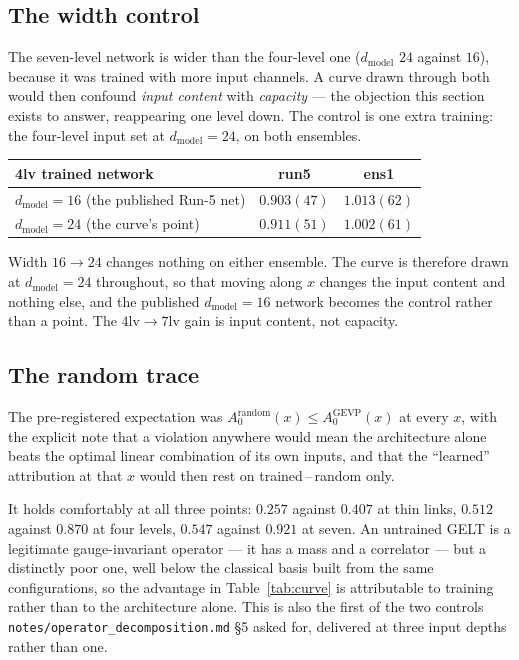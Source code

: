 \documentclass[11pt,a4paper]{article}
\newcommand{\Azero}{A_0}
\begin{document}
\subsection{The width control}
\label{sec:width}

The seven-level network is wider than the four-level one ($d_{\text{model}}$
$24$ against $16$), because it was trained with more input channels. A curve
drawn through both would then confound \emph{input content} with \emph{capacity}
--- the objection this section exists to answer, reappearing one level down. The
control is one extra training: the four-level input set at $d_{\text{model}} =
24$, on both ensembles.

\begin{center}\small
\begin{tabular}{@{}lcc@{}}
\toprule
4lv trained network & run5 & ens1 \\
\midrule
$d_{\text{model}} = 16$ (the published Run-5 net) & $0.903(47)$ & $1.013(62)$ \\
$d_{\text{model}} = 24$ (the curve's point)       & $0.911(51)$ & $1.002(61)$ \\
\bottomrule
\end{tabular}
\end{center}

Width $16 \to 24$ changes nothing on either ensemble. The curve is therefore
drawn at $d_{\text{model}} = 24$ throughout, so that moving along $x$ changes
the input content and nothing else, and the published $d_{\text{model}} = 16$
network becomes the control rather than a point. The $4\text{lv} \to 7\text{lv}$
gain is input content, not capacity.

\subsection{The random trace}
\label{sec:randomtrace}

The pre-registered expectation was $\Azero^{\text{random}}(x) \le
\Azero^{\text{GEVP}}(x)$ at every $x$, with the explicit note that a violation
anywhere would mean the architecture alone beats the optimal linear combination
of its own inputs, and that the ``learned'' attribution at that $x$ would then
rest on trained\,--\,random only.

It holds comfortably at all three points: $0.257$ against $0.407$ at thin links,
$0.512$ against $0.870$ at four levels, $0.547$ against $0.921$ at seven. An
untrained GELT is a legitimate gauge-invariant operator --- it has a mass and a
correlator --- but a distinctly poor one, well below the classical basis built
from the same configurations, so the advantage in Table~\ref{tab:curve} is
attributable to training rather than to the architecture alone. This is also the
first of the two controls \texttt{notes/operator\_decomposition.md} \S5 asked
for, delivered at three input depths rather than one.
\end{document}
